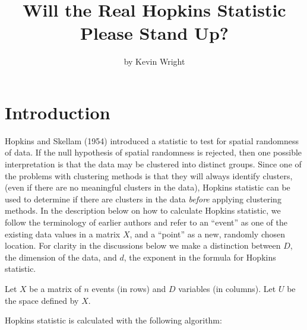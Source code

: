 \title{Will the Real Hopkins Statistic Please Stand Up?}
\author{by Kevin Wright}

\maketitle


\hypertarget{introduction}{%
\section{Introduction}\label{introduction}}

Hopkins and Skellam (1954) introduced a statistic to test for spatial randomness of data. If the null hypothesis of spatial randomness is rejected, then one possible interpretation is that the data may be clustered into distinct groups. Since one of the problems with clustering methods is that they will always identify clusters, (even if there are no meaningful clusters in the data), Hopkins statistic can be used to determine if there are clusters in the data \emph{before} applying clustering methods. In the description below on how to calculate Hopkins statistic, we follow the terminology of earlier authors and refer to an ``event'' as one of the existing data values in a matrix \(X\), and a ``point'' as a new, randomly chosen location. For clarity in the discussions below we make a distinction between \(D\), the dimension of the data, and \(d\), the exponent in the formula for Hopkins statistic.

Let \(X\) be a matrix of \(n\) events (in rows) and \(D\) variables (in columns). Let \(U\) be the space defined by \(X\).

Hopkins statistic is calculated with the following algorithm:


